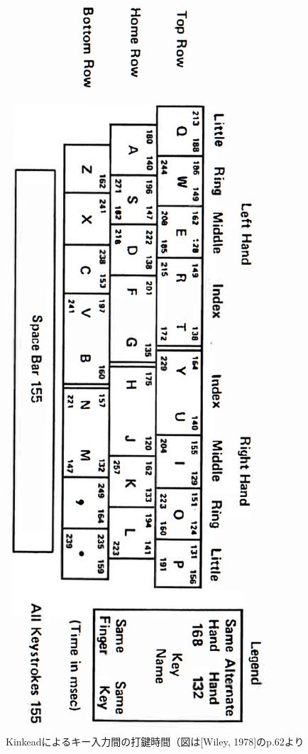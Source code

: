 \begin{figure}[htbp]
 \begin{center}
  \includegraphics[height=0.9\vsize]{kinkead.eps}
 \end{center}
 \caption{Kinkeadによるキー入力間の打鍵時間（図は[Wiley, 1978]のp.62より}
 \label{fig:kinkead1}
\end{figure}

